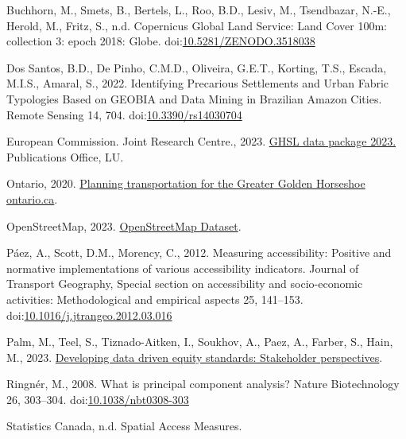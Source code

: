 \documentclass[conference,final,]{IEEEtran}
\newlength{\cslhangindent}
\newlength{\cslentryspacingunit} %
\newenvironment{CSLReferences}[2] %
 {%
  \setlength{\parindent}{0pt}
  \ifodd #1
  \let\oldpar\par
  \def\par{\hangindent=\cslhangindent\oldpar}
  \fi
  \setlength{\parskip}{#2\cslentryspacingunit}
 }%
 {}
\begin{document}
\hypertarget{refs}{}
\begin{CSLReferences}{1}{0}
\leavevmode{}%
Buchhorn, M., Smets, B., Bertels, L., Roo, B.D., Lesiv, M., Tsendbazar,
N.-E., Herold, M., Fritz, S., n.d. Copernicus Global Land Service: Land
Cover 100m: collection 3: epoch 2018: Globe.
doi:\href{https://doi.org/10.5281/ZENODO.3518038}{10.5281/ZENODO.3518038}

\leavevmode{}%
Dos Santos, B.D., De Pinho, C.M.D., Oliveira, G.E.T., Korting, T.S.,
Escada, M.I.S., Amaral, S., 2022. Identifying Precarious Settlements and
Urban Fabric Typologies Based on GEOBIA and Data Mining in Brazilian
Amazon Cities. Remote Sensing 14, 704.
doi:\href{https://doi.org/10.3390/rs14030704}{10.3390/rs14030704}

\leavevmode{}%
European Commission. Joint Research Centre., 2023.
\href{https://data.europa.eu/doi/10.2760/098587}{GHSL data package
2023.} Publications Office, LU.

\leavevmode{}%
Ontario, 2020.
\href{http://www.ontario.ca/page/planning-transportation-greater-golden-horseshoe}{Planning
transportation for the Greater Golden Horseshoe \textbar{} ontario.ca}.

\leavevmode{}%
OpenStreetMap, 2023. \href{https://www.openstreetmap.org/}{OpenStreetMap
Dataset}.

\leavevmode{}%
Páez, A., Scott, D.M., Morency, C., 2012. Measuring accessibility:
Positive and normative implementations of various accessibility
indicators. Journal of Transport Geography, Special section on
accessibility and socio-economic activities: Methodological and
empirical aspects 25, 141--153.
doi:\href{https://doi.org/10.1016/j.jtrangeo.2012.03.016}{10.1016/j.jtrangeo.2012.03.016}

\leavevmode{}%
Palm, M., Teel, S., Tiznado-Aitken, I., Soukhov, A., Paez, A., Farber,
S., Hain, M., 2023.
\href{https://mobilizingjustice.ca/wp-content/uploads/2023/06/Developing_Data_Driven_Standards_FINAL_2023_06_06.pdf}{Developing
data driven equity standards: Stakeholder perspectives}.

\leavevmode{}%
Ringnér, M., 2008. What is principal component analysis? Nature
Biotechnology 26, 303--304.
doi:\href{https://doi.org/10.1038/nbt0308-303}{10.1038/nbt0308-303}

\leavevmode{}%
Statistics Canada, n.d. Spatial Access Measures.

\end{CSLReferences}
\end{document}
